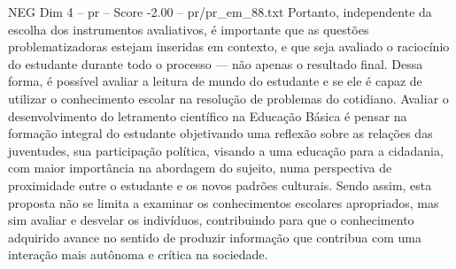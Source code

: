 \begin{textsample}{NEG Dim 4 – pr – Score -2.00 – pr/pr\_em\_88.txt}
Portanto, independente da escolha dos instrumentos avaliativos, é importante que as questões problematizadoras estejam inseridas em contexto, e que seja avaliado o raciocínio do estudante durante todo o processo — não apenas o resultado final.
Dessa forma, é possível avaliar a leitura de mundo do estudante e se ele é capaz de utilizar o conhecimento escolar na resolução de problemas do cotidiano.
Avaliar o desenvolvimento do letramento científico na Educação Básica é pensar na formação integral do estudante objetivando uma reflexão sobre as relações das juventudes, sua participação política, visando a uma educação para a cidadania, com maior importância na abordagem do sujeito, numa perspectiva de proximidade entre o estudante e os novos padrões culturais.
Sendo assim, esta proposta não se limita a examinar os conhecimentos escolares apropriados, mas sim avaliar e desvelar os indivíduos, contribuindo para que o conhecimento adquirido avance no sentido de produzir informação que contribua com uma interação mais autônoma e crítica na sociedade.

\end{textsample}
